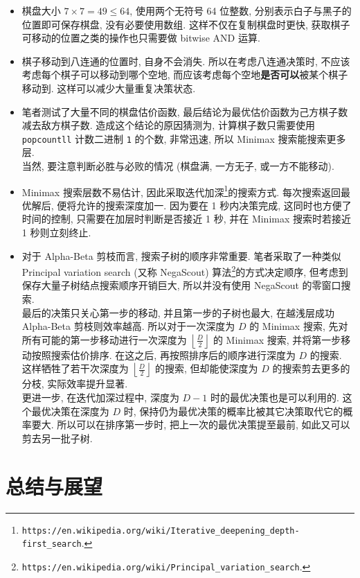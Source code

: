 \documentclass[12pt]{article}
\begin{document}
\begin{itemize}
    \item 棋盘大小 $7 \times 7 = 49 \leq 64$, 使用两个无符号 64 位整数, 分别表示白子与黑子的位置即可保存棋盘, 没有必要使用数组. 这样不仅在复制棋盘时更快, 获取棋子可移动的位置之类的操作也只需要做 bitwise AND 运算.
    \item 棋子移动到八连通的位置时, 自身不会消失. 所以在考虑八连通决策时, 不应该考虑每个棋子可以移动到哪个空地, 而应该考虑每个空地\textbf{是否可以}被某个棋子移动到. 这样可以减少大量重复决策状态.
    \item 笔者测试了大量不同的棋盘估价函数, 最后结论为最优估价函数为己方棋子数减去敌方棋子数. 造成这个结论的原因猜测为, 计算棋子数只需要使用 \texttt{popcountll} 计数二进制 \texttt{1} 的个数, 非常迅速, 所以 Minimax 搜索能搜索更多层. \\ 当然, 要注意判断必胜与必败的情况 (棋盘满, 一方无子, 或一方不能移动).
    \item Minimax 搜索层数不易估计, 因此采取迭代加深\footnote{\texttt{https://en.wikipedia.org/wiki/Iterative\_deepening\_depth-first\_search}.}的搜索方式. 每次搜索返回最优解后, 便将允许的搜索深度加一. 因为要在 1 秒内决策完成, 这同时也方便了时间的控制, 只需要在加层时判断是否接近 1 秒, 并在 Minimax 搜索时若接近 1 秒则立刻终止.
    \item 对于 Alpha-Beta 剪枝而言, 搜索子树的顺序非常重要. 笔者采取了一种类似 Principal variation search (又称 NegaScout) 算法\footnote{\texttt{https://en.wikipedia.org/wiki/Principal\_variation\_search}.}的方式决定顺序, 但考虑到保存大量子树结点搜索顺序开销巨大, 所以并没有使用 NegaScout 的零窗口搜索. \\ 最后的决策只关心第一步的移动, 并且第一步的子树也最大, 在越浅层成功 Alpha-Beta 剪枝则效率越高. 所以对于一次深度为 $D$ 的 Minimax 搜索, 先对所有可能的第一步移动进行一次深度为 $\left\lfloor \frac{D}{2} \right\rfloor$ 的 Minimax 搜索, 并将第一步移动按照搜索估价排序. 在这之后, 再按照排序后的顺序进行深度为 $D$ 的搜索. 这样牺牲了若干次深度为 $\left\lfloor \frac{D}{2} \right\rfloor$ 的搜索, 但却能使深度为 $D$ 的搜索剪去更多的分枝, 实际效率提升显著. \\ 更进一步, 在迭代加深过程中, 深度为 $D - 1$ 时的最优决策也是可以利用的. 这个最优决策在深度为 $D$ 时, 保持仍为最优决策的概率比被其它决策取代它的概率要大. 所以可以在排序第一步时, 把上一次的最优决策提至最前, 如此又可以剪去另一批子树.
\end{itemize}

\section{总结与展望}
\end{document}
